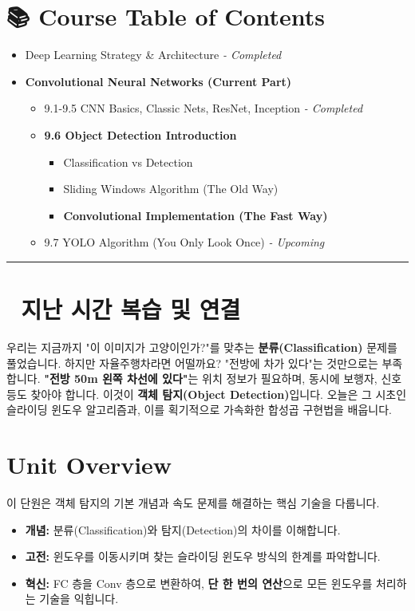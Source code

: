 \documentclass[11pt,a4paper]{book}
\theoremstyle{definition}
\begin{document}
\section*{📚 Course Table of Contents}
\begin{itemize}
    \item[Chapter 1-8.] Deep Learning Strategy \& Architecture \textit{- Completed}
    \item[\textbf{Chapter 9.}] \textbf{Convolutional Neural Networks (Current Part)}
    \begin{itemize}
        \item 9.1-9.5 CNN Basics, Classic Nets, ResNet, Inception \textit{- Completed}
        \item \textbf{9.6 Object Detection Introduction}
        \begin{itemize}
            \item Classification vs Detection
            \item Sliding Windows Algorithm (The Old Way)
            \item \textbf{Convolutional Implementation (The Fast Way)}
        \end{itemize}
        \item 9.7 YOLO Algorithm (You Only Look Once) \textit{- Upcoming}
    \end{itemize}
\end{itemize}

\vspace{0.5cm}
\hrule
\vspace{0.5cm}

\section*{🔗 지난 시간 복습 및 연결}
우리는 지금까지 "이 이미지가 고양이인가?"를 맞추는 \textbf{분류(Classification)} 문제를 풀었습니다.
하지만 자율주행차라면 어떨까요? "전방에 차가 있다"는 것만으로는 부족합니다. \textbf{"전방 50m 왼쪽 차선에 있다"}는 위치 정보가 필요하며, 동시에 보행자, 신호등도 찾아야 합니다.
이것이 \textbf{객체 탐지(Object Detection)}입니다. 오늘은 그 시초인 슬라이딩 윈도우 알고리즘과, 이를 획기적으로 가속화한 합성곱 구현법을 배웁니다.

\section{Unit Overview}
\begin{summarybox}[title={핵심 목표}]
이 단원은 객체 탐지의 기본 개념과 속도 문제를 해결하는 핵심 기술을 다룹니다.
\begin{itemize}
    \item \textbf{개념:} 분류(Classification)와 탐지(Detection)의 차이를 이해합니다.
    \item \textbf{고전:} 윈도우를 이동시키며 찾는 슬라이딩 윈도우 방식의 한계를 파악합니다.
    \item \textbf{혁신:} FC 층을 Conv 층으로 변환하여, \textbf{단 한 번의 연산}으로 모든 윈도우를 처리하는 기술을 익힙니다.
\end{itemize}
\end{summarybox}
\end{document}
